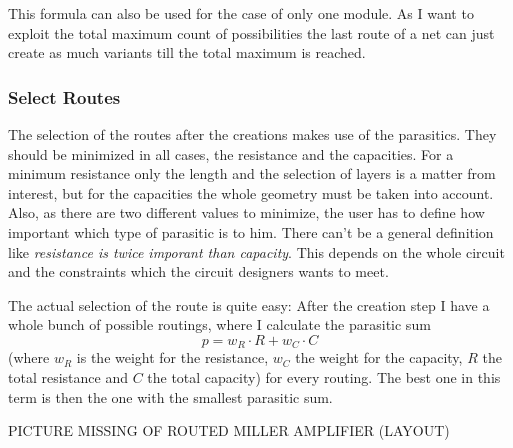 This formula can also be used for the case of only one module. As I want to exploit the total maximum count of possibilities the last route of a net can just create as much variants till the total maximum is reached.

\subsubsection{Select Routes}
The selection of the routes after the creations makes use of the parasitics. They should be minimized in all cases, the resistance and the capacities. For a minimum resistance only the length and the selection of layers is a matter from interest, but for the capacities the whole geometry must be taken into account. Also, as there are two different values to minimize, the user has to define how important which type of parasitic is to him. There can't be a general definition like \emph{resistance is twice imporant than capacity}. This depends on the whole circuit and the constraints which the circuit designers wants to meet.

The actual selection of the route is quite easy: After the creation step I have a whole bunch of possible routings, where I calculate the parasitic sum
\[p = w_R \cdot R + w_C \cdot C\]
(where $w_R$ is the weight for the resistance, $w_C$ the weight for the capacity, $R$ the total resistance and $C$ the total capacity) for every routing. The best one in this term is then the one with the smallest parasitic sum.

PICTURE MISSING OF ROUTED MILLER AMPLIFIER (LAYOUT)